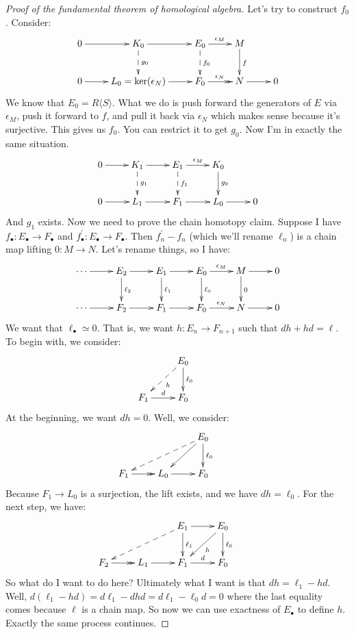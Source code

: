\documentclass{amsart}
\theoremstyle{theorem}
\theoremstyle{definition}
\begin{document}
\begin{proof}[Proof of the fundamental theorem of homological algebra]
Let's try to construct $f_0$. Consider:
\begin{equation*}
\xymatrix{0\ar[r] & K_0\ar[r]\ar@{-->}[d]^{g_0} & E_0\ar[r]^{\epsilon_M}\ar@{-->}[d]^{f_0} & M\ar[d]^f &\\
0\ar[r] & L_0=\ker(\epsilon_N)\ar[r] & F_0\ar@{->>}[r]^{\epsilon_N} & N\ar[r] & 0}
\end{equation*}
We know that $E_0=R\langle S\rangle$. What we do is push forward the generators of $E$ via $\epsilon_M$, push it forward to $f$, and pull it back via $\epsilon_N$ which makes sense because it's surjective. This gives us $f_0$. You can restrict it to get $g_0$. Now I'm in exactly the same situation.
\begin{equation*}
\xymatrix{0\ar[r] & K_1\ar[r]\ar@{-->}[d]^{g_1} & E_1\ar[r]^{\epsilon_M}\ar@{-->}[d]^{f_1} & K_0\ar[d]^{g_0} &\\
0\ar[r] & L_1\ar[r] & F_1\ar[r] & L_0\ar[r] & 0}
\end{equation*}
And $g_1$ exists. Now we need to prove the chain homotopy claim. Suppose I have $f_\bullet:E_\bullet\to F_\bullet$ and $f^{\prime}_\bullet:E_\bullet\to F_\bullet$. Then $f^\prime_n-f_n$ (which we'll rename $\ell_n$) is a chain map lifting $0:M\to N$. Let's rename things, so I have:
\begin{equation*}
\xymatrix{\cdots\ar[r] & E_2\ar[r]\ar[d]^{\ell_2} & E_1\ar[r]\ar[d]^{\ell_1} & E_0\ar[r]^{\epsilon_M}\ar[d]^{\ell_0} & M\ar[d]^0\ar[r] & 0\\
\cdots\ar[r] & F_2\ar[r] & F_1\ar[r] & F_0\ar[r]^{\epsilon_N} & N\ar[r] & 0}
\end{equation*}
We want that $\ell_\bullet\simeq 0$. That is, we want $h:E_n\to F_{n+1}$ such that $dh+hd=\ell$. To begin with, we consider:
\begin{equation*}
\xymatrix{ & E_0\ar[d]^{\ell_0}\ar@{-->}[dl]^h & \\
F_1\ar[r]^d & F_0}
\end{equation*}
At the beginning, we want $dh=0$. Well, we consider:
\begin{equation*}
\xymatrix{ & & E_0\ar[d]^{\ell_0}\ar[dl]\ar@{-->}[dll] & \\
F_1\ar@{->>}[r] & L_0\ar[r] & F_0}
\end{equation*}
Because $F_1\to L_0$ is a surjection, the lift exists, and we have $dh=\ell_0$. For the next step, we have:
\begin{equation*}
\xymatrix{ & & E_1\ar[r]\ar[d]^{\ell_1}\ar@{-->}[dll] & E_0\ar[d]^{\ell_0}\ar[dl]^h & \\
F_2\ar@{->>}[r] & L_1\ar[r] & F_1\ar[r]^d & F_0}
\end{equation*}
So what do I want to do here? Ultimately what I want is that $dh=\ell_1-hd$. Well, $d(\ell_1-hd)=d\ell_1-dhd=d\ell_1-\ell_0d=0$ where the last equality comes because $\ell$ is a chain map. So now we can use exactness of $E_\bullet$ to define $h$. Exactly the same process continues.
\end{proof}
\end{document}
